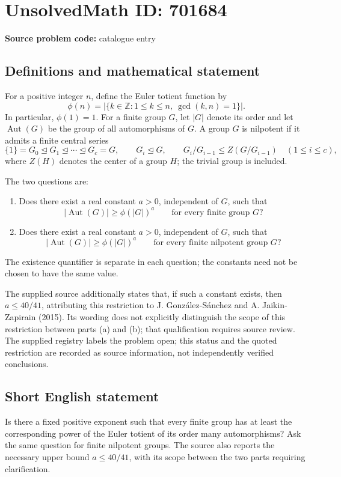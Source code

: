 \documentclass[11pt]{article}
\newcommand{\Z}{\mathbb{Z}}
\begin{document}
\section*{UnsolvedMath ID: 701684}
\textbf{Source problem code:} catalogue entry
\subsection{Definitions and mathematical statement}
For a positive integer \(n\), define the Euler totient function by
\[
\phi(n)=\bigl|\{k\in\Z:1\leq k\leq n,\ \gcd(k,n)=1\}\bigr|.
\]
In particular, \(\phi(1)=1\). For a finite group \(G\), let \(|G|\) denote its order and let \(\operatorname{Aut}(G)\) be the group of all automorphisms of \(G\). A group \(G\) is nilpotent if it admits a finite central series
\[
\{1\}=G_0\trianglelefteq G_1\trianglelefteq\cdots\trianglelefteq G_c=G,
\qquad G_i\trianglelefteq G,\qquad
G_i/G_{i-1}\leq Z(G/G_{i-1})\quad(1\leq i\leq c),
\]
where \(Z(H)\) denotes the center of a group \(H\); the trivial group is included.

The two questions are:
\begin{enumerate}
\item[(a)] Does there exist a real constant \(a>0\), independent of \(G\), such that
\[
|\operatorname{Aut}(G)|\geq \phi(|G|)^a
\qquad\text{for every finite group }G?
\]
\item[(b)] Does there exist a real constant \(a>0\), independent of \(G\), such that
\[
|\operatorname{Aut}(G)|\geq \phi(|G|)^a
\qquad\text{for every finite nilpotent group }G?
\]
\end{enumerate}
The existence quantifier is separate in each question; the constants need not be chosen to have the same value.

The supplied source additionally states that, if such a constant exists, then \(a\leq 40/41\), attributing this restriction to J. Gonz\'alez-S\'anchez and A. Jaikin-Zapirain (2015). Its wording does not explicitly distinguish the scope of this restriction between parts (a) and (b); that qualification requires source review. The supplied registry labels the problem open; this status and the quoted restriction are recorded as source information, not independently verified conclusions.
\subsection{Short English statement}
Is there a fixed positive exponent such that every finite group has at least the corresponding power of the Euler totient of its order many automorphisms? Ask the same question for finite nilpotent groups. The source also reports the necessary upper bound \(a\leq 40/41\), with its scope between the two parts requiring clarification.
\end{document}
